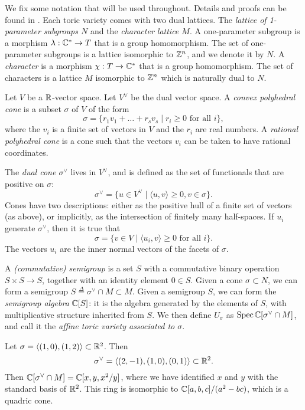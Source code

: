 We fix some notation that will be used throughout. Details and proofs can be found in \cite{cox_toric,fulton_toric}. Each toric variety comes with two dual lattices. The \emph{lattice of 1-parameter subgroups $N$} and the \emph{character lattice $M$}. A one-parameter subgroup is a morphism $\lambda:\mathbb{C} ^\ast \to T$ that is a group homomorphism. The set of one-parameter subgroups is a lattice isomorphic to $\mathbb{Z}^n$, and we denote it by $N$. A \emph{character} is a morphism $\chi:T \to \mathbb{C}^\ast$ that is a group homomorphism. The set of characters is a lattice $M$ isomorphic to $\mathbb{Z}^n$ which is naturally dual to $N$.

Let $V$ be a $\mathbb{R}$-vector space. Let $V^\vee$ be the dual vector space. A \emph{convex polyhedral cone} is a subset $\sigma$ of $V$ of the form
$$
\sigma = \{ r_1 v_1 + \ldots + r_s v_s \mid r_i \geq 0 \text{ for all } i \},
$$
where the $v_i$ is a finite set of vectors in $V$ and the $r_i$ are real numbers. A \emph{rational polyhedral cone} is a cone such that the vectors $v_i$ can be taken to have rational coordinates.

The \emph{dual cone $\sigma^\vee$} lives in $V^\vee$, and is defined as the set of functionals that are positive on $\sigma$:
$$
\sigma^\vee = \{ u \in V^\vee \mid \langle u,v\rangle \geq 0, v \in \sigma \}.
$$
Cones have two descriptions: either as the positive hull of a finite set of vectors (as above), or implicitly, as the intersection of finitely many half-spaces. If $u_i$ generate $\sigma^\vee$, then it is true that
$$
\sigma = \{ v \in V \mid \langle u_i,v \rangle \geq 0 \text{ for all } i \}.
$$
The vectors $u_i$ are the inner normal vectors of the facets of $\sigma$.

A \emph{(commutative) semigroup} is a set $S$ with a commutative binary operation $S \times S \to S$, together with an identity element $0 \in S$. Given a cone $\sigma \subset N$, we can form a semigroup $S\stackrel{\Delta}{=} \sigma^\vee \cap M \subset M$. Given a semigroup $S$, we can form the \emph{semigroup algebra} $\mathbb{C}[S]$: it is the algebra generated by the elements of $S$, with multiplicative structure inherited from $S$. We then define $U_\sigma$ as $\operatorname{Spec} \mathbb{C}[\sigma^\vee \cap M]$, and call it the \emph{affine toric variety associated to $\sigma$}. 

\begin{example}
Let $\sigma=\langle (1,0), (1,2) \rangle \subset \mathbb{R}^2$. Then
\[
\sigma^\vee = \langle (2,-1),(1,0),(0,1) \rangle \subset \mathbb{R}^2.
\]
Then $\mathbb{C}[\sigma^\vee \cap M] = \mathbb{C}[x,y,x^2/y]$, where we have identified $x$ and $y$ with the standard basis of $\mathbb{R}^2$. This ring is isomorphic to $\mathbb{C}[a,b,c]/(a^2-bc)$, which is a quadric cone.
\end{example}

